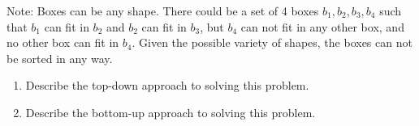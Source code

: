 \documentclass[10pt]{article}
\begin{document}
Note: Boxes can be any shape. There could be a set of 4 boxes $b_1,b_2,b_3,b_4$ such that $b_1$ can fit in $b_2$ and $b_2$ can fit in $b_3$, but $b_4$ can not fit in any other box, and no other box can fit in $b_4$. Given the possible variety of shapes, the boxes can not be sorted in any way.

\begin{enumerate}
    
\item Describe the top-down approach to solving this problem. 

\solution{
}

\item Describe the bottom-up approach to solving this problem.

\solution{
}

\end{enumerate}

\end{document}
